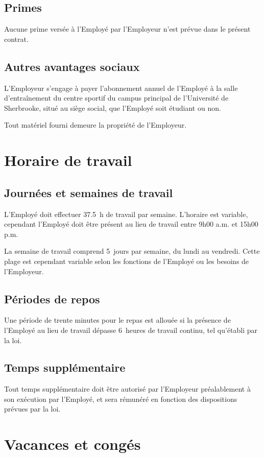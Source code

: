 \documentclass{article}
\begin{document}
    	\subsection{Primes}
    	Aucune prime versée à l'Employé par l'Employeur n'est prévue dans le présent contrat.
    	
    	\subsection{Autres avantages sociaux}
    	L'Employeur s'engage à payer l'abonnement annuel de l'Employé à la salle d'entraînement du centre sportif du campus principal de l'Université de Sherbrooke, situé au siège social, que l'Employé soit étudiant ou non.
    	       	
    	Tout matériel fourni demeure la propriété de l'Employeur.
    
    \section{Horaire de travail}
    	\subsection{Journées et semaines de travail}
    	L'Employé doit effectuer \SI{37,5}{h} de travail par semaine. L'horaire est variable, cependant l'Employé doit être présent au lieu de travail entre 9h00 a.m. et 15h00 p.m.
    	
    	La semaine de travail comprend 5~jours par semaine, du lundi au vendredi. Cette plage est cependant variable selon les fonctions de l'Employé ou les besoins de l'Employeur.
    	
    	\subsection{Périodes de repos}
    	Une période de trente minutes pour le repas est allouée si la présence de l'Employé au lieu de travail dépasse 6~heures de travail continu, tel qu'établi par la loi.
    	
    	\subsection{Temps supplémentaire}
    	Tout temps supplémentaire doit être autorisé par l'Employeur préalablement à son exécution par l'Employé, et sera rémunéré en fonction des dispositions prévues par la loi.  	
    	
    \section{Vacances et congés}
\end{document}
